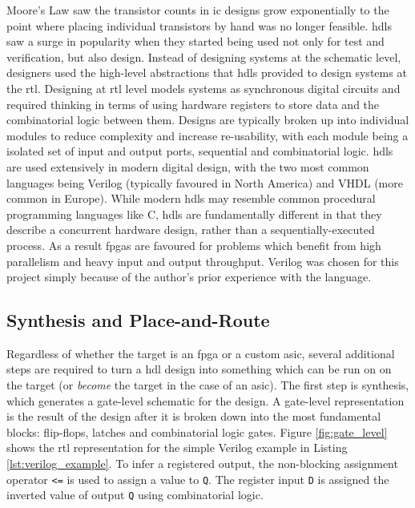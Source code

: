 Moore's Law saw the transistor counts in \gls{ic} designs grow exponentially to the point where placing individual transistors by hand was no longer feasible. \Glspl{hdl} saw a surge in popularity when they started being used not only for test and verification, but also design. Instead of designing systems at the schematic level, designers used the high-level abstractions that \glspl{hdl} provided to design systems at the \gls{rtl}. Designing at \gls{rtl} level models systems as synchronous digital circuits and required thinking in terms of using hardware registers to store data and the combinatorial logic between them. Designs are typically broken up into individual modules to reduce complexity and increase re-usability, with each module being a isolated set of input and output ports, sequential and combinatorial logic. \Glspl{hdl} are used extensively in modern digital design, with the two most common languages being Verilog (typically favoured in North America) and VHDL (more common in Europe). While modern \glspl{hdl} may resemble common procedural programming languages like C, \glspl{hdl} are fundamentally different in that they describe a concurrent hardware design, rather than a sequentially-executed process. As a result \glspl{fpga} are favoured for problems which benefit from high parallelism and heavy input and output throughput. Verilog was chosen for this project simply because of the author's prior experience with the language.

\subsection{Synthesis and Place-and-Route}

Regardless of whether the target is an \gls{fpga} or a custom \gls{asic}, several additional steps are required to turn a \gls{hdl} design into something which can be run on on the target (or \textit{become} the target in the case of an \gls{asic}). The first step is synthesis, which generates a gate-level schematic for the design. A gate-level representation is the result of the design after it is broken down into the most fundamental blocks: flip-flops, latches and combinatorial logic gates. Figure \ref{fig:gate_level} shows the \gls{rtl} representation for the simple Verilog example in Listing \ref{lst:verilog_example}. To infer a registered output, the non-blocking assignment operator \texttt{<=} is used to assign a value to \texttt{Q}. The register input \texttt{D} is assigned the inverted value of output \texttt{Q} using combinatorial logic.

